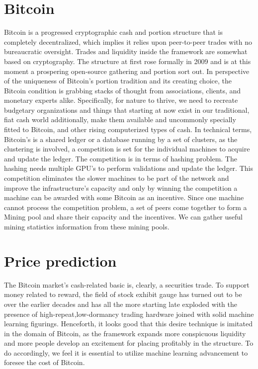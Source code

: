 \documentclass[sigconf]{acmart}
\begin{document}
\section{Bitcoin}
Bitcoin is a progressed cryptographic cash and portion structure that is completely decentralized, which implies it relies upon peer-to-peer trades with no bureaucratic oversight. Trades and liquidity inside the framework are somewhat based on cryptography. The structure at first rose formally in 2009 and is at this moment a prospering open-source gathering and portion sort out. In perspective of the uniqueness of Bitcoin's portion tradition and its creating choice, the Bitcoin condition is grabbing stacks of thought from associations, clients, and monetary experts alike. Specifically, for nature to thrive, we need to recreate budgetary organizations and things that starting at now exist in our traditional, fiat cash world additionally, make them available and uncommonly specially fitted to Bitcoin, and other rising computerized types of cash.
In technical terms, Bitcoin's is a shared ledger or a database running by a set of clusters, as the clustering is involved, a competition is set for the individual machines to acquire and update the ledger. The competition is in terms of hashing problem. The hashing needs multiple GPU's to perform validations and update the ledger. This competition eliminates the slower machines to be part of the network and improve the infrastructure's capacity and only by winning the competition  a machine can be awarded with some Bitcoin as an incentive. Since one machine cannot process the competition problem, a set of peers come together to form a Mining pool and share their capacity and the incentives. We can gather useful mining statistics information from these mining pools.
 
 \section{Price prediction}
 The Bitcoin market's cash-related basic is, clearly, a securities trade. To support money related to reward, the field of stock exhibit gauge has turned out to be over the earlier decades and has all the more starting late exploded with the presence of high-repeat,low-dormancy trading hardware joined with solid machine learning figurings. Henceforth, it looks good that this desire technique is imitated in the domain of Bitcoin, as the framework expands more conspicuous liquidity and more people develop an excitement for placing profitably in the structure. To do accordingly, we feel it is essential to utilize machine learning advancement to foresee the cost of Bitcoin.
 
\end{document}
